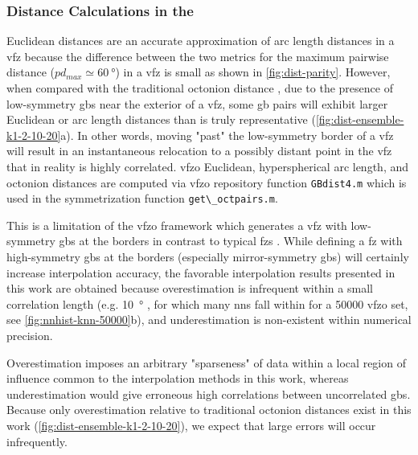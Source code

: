 \documentclass[final,twocolumn,12pt]{elsarticle}
\newcommand{\matlab}[1]{\mbox{\lstinline[style=Matlab-editor]{#1}}}
\newcommand{\vfzorepo}{\gls{vfzo} repository}
\begin{document}
\subsubsection{Distance Calculations in the }
\label{sec:methods:vfz-dist}

Euclidean distances are an accurate approximation of arc length distances in a \gls{vfz} because the difference between the two metrics for the maximum pairwise distance ($pd_{max} \simeq \SI{60}{\degree}$) in a \gls{vfz} is small as shown in \cref{fig:dist-parity}. However, when compared with the traditional octonion distance \cite{francisGeodesicOctonionMetric2019}, due to the presence of low-symmetry \glspl{gb} near the exterior of a \gls{vfz}, some \gls{gb} pairs will exhibit larger Euclidean or arc length distances than is truly representative (\cref{fig:dist-ensemble-k1-2-10-20}a). In other words, moving "past" the low-symmetry border of a \gls{vfz} will result in an instantaneous relocation to a possibly distant point in the \gls{vfz} that in reality is highly correlated. \Gls{vfzo} Euclidean, hyperspherical arc length, and octonion distances are computed via \vfzorepo{} function \matlab{GBdist4.m} which is used in the symmetrization function \matlab{get\_octpairs.m}.

This is a limitation of the \gls{vfzo} framework which generates a \gls{vfz} with low-symmetry \glspl{gb} at the borders in contrast to typical \glspl{fz} \cite{patalaSymmetriesRepresentationGrain2013,homerGrainBoundaryPlane2015}. While defining a \gls{fz} with high-symmetry \glspl{gb} at the borders (especially mirror-symmetry \glspl{gb}) will certainly increase interpolation accuracy, the favorable interpolation results presented in this work are obtained because overestimation is infrequent within a small correlation length (e.g. \SI{10}{\degree} \cite{olmstedSurveyComputedGrain2009}, for which many \glspl{nn} fall within for a \num{50000} \gls{vfzo} set, see \cref{fig:nnhist-knn-50000}b), and underestimation is non-existent within numerical precision.

Overestimation imposes an arbitrary "sparseness" of data within a local region of influence common to the interpolation methods in this work, whereas underestimation would give erroneous high correlations between uncorrelated \glspl{gb}. Because only overestimation relative to traditional octonion distances exist in this work (\cref{fig:dist-ensemble-k1-2-10-20}), we expect that large errors will occur infrequently. %
\end{document}
